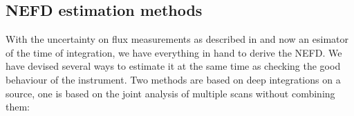 

\subsection{NEFD estimation methods}
\label{se:nefd_estimation_methods}

With the uncertainty on flux measurements as described in  and
now an esimator of the time of integration, we have everything in hand to derive
the NEFD. We have devised several ways to estimate it at the same time as
checking the good behaviour of the instrument. Two methods are based on deep
integrations on a source, one is based on the joint analysis of multiple scans
without combining them:

